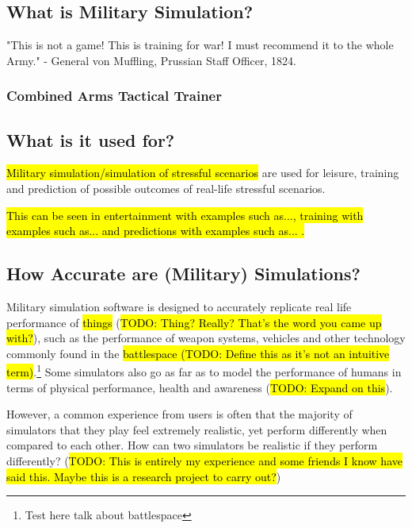 \documentclass{article}
\begin{document}
\subsection{What is Military Simulation?}

"This is not a game! This is training for war! I must recommend it to the whole Army." - General von Muffling, Prussian Staff Officer, 1824.

\subsubsection{Combined Arms Tactical Trainer}




\subsection{What is it used for?}

\hl{Military simulation/simulation of stressful scenarios} are used for leisure, training and prediction of possible outcomes of real-life stressful scenarios.

\hl{This can be seen in entertainment with examples such as..., training with examples such as... and predictions with examples such as... .}

\subsection{How Accurate are (Military) Simulations?}

Military simulation software is designed to accurately replicate real life performance of \hl{things} (\hl{TODO: Thing? Really? That's the word you came up with?}), such as the performance of weapon systems, vehicles and other technology commonly found in the \hl{battlespace (TODO: Define this as it's not an intuitive term)}.\footnote{Test here talk about battlespace} Some simulators also go as far as to model the performance of humans in terms of physical performance, health and awareness (\hl{TODO: Expand on this}).

However, a common experience from users is often that the majority of simulators that they play feel extremely realistic, yet perform differently when compared to each other. How can two simulators be realistic if they perform differently? (\hl{TODO: This is entirely my experience and some friends I know have said this. Maybe this is a research project to carry out?})
\end{document}
